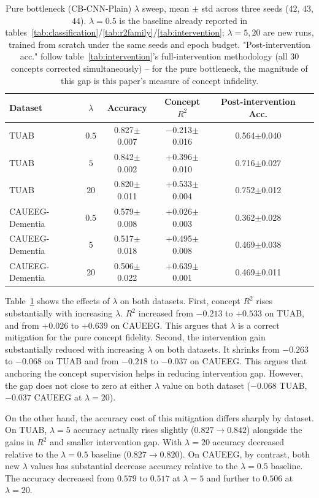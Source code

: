 \documentclass[journal,twoside,web]{ieeecolor}
\begin{document}
\begin{table}[h]
\caption{Pure bottleneck (CB-CNN-Plain) $\lambda$ sweep, mean $\pm$ std across three seeds ($42$, $43$, $44$). $\lambda=0.5$ is the baseline already reported in tables~\ref{tab:classification}/\ref{tab:r2family}/\ref{tab:intervention}; $\lambda=5,20$ are new runs, trained from scratch under the same seeds and epoch budget. "Post-intervention acc." follow table~\ref{tab:intervention}'s full-intervention methodology (all $30$ concepts corrected simultaneously) -- for the pure bottleneck, the magnitude of this gap is this paper's measure of concept infidelity.}

\centering
\begin{tabular}{l c cccc}
\hline
Dataset & $\lambda$ & Accuracy & Concept $R^2$ & Post-intervention Acc. \\
\hline
TUAB & $0.5$ & 0.827$\pm$0.007 & $-$0.213$\pm$0.016 & 0.564$\pm$0.040  \\
TUAB & $5$   & 0.842$\pm$0.002 & +0.396$\pm$0.010 & 0.716$\pm$0.027 \\
TUAB & $20$  & 0.820$\pm$0.011 & +0.533$\pm$0.004 & 0.752$\pm$0.012  \\
\hline
CAUEEG-Dementia & $0.5$ & 0.579$\pm$0.008 & +0.026$\pm$0.003 & 0.362$\pm$0.028  \\
CAUEEG-Dementia & $5$   & 0.517$\pm$0.018 & +0.495$\pm$0.008 & 0.469$\pm$0.038  \\
CAUEEG-Dementia & $20$  & 0.506$\pm$0.022 & +0.639$\pm$0.001 & 0.469$\pm$0.011  \\
\hline
\end{tabular}
\label{tab:lambda_sweep}
\end{table}

Table~\ref{tab:lambda_sweep} shows the effects of $\lambda$ on both datasets. First, concept $R^2$ rises substantially with increasing $\lambda$. $R^2$ increased from $-0.213$ to $+0.533$ on TUAB, and from $+0.026$ to $+0.639$ on CAUEEG. This argues that $\lambda$ is a correct mitigation for the pure concept fidelity. Second, the intervention gain substantially reduced with increasing $\lambda$ on both datasets. It shrinks from $-0.263$ to $-0.068$ on TUAB and from $-0.218$ to $-0.037$ on CAUEEG. This argues that anchoring the concept supervision helps in reducing intervention gap. However, the gap does not close to zero at either $\lambda$ value on both dataset ($-0.068$ TUAB, $-0.037$ CAUEEG at $\lambda=20$). 

On the other hand, the accuracy cost of this mitigation differs sharply by dataset. On TUAB, $\lambda=5$ accuracy actually rises slightly ($0.827 \to 0.842$) alongside the gains in $R^2$ and smaller intervention gap. With $\lambda=20$ accuracy decreased relative to the $\lambda=0.5$ baseline ($0.827 \to 0.820$). On CAUEEG, by contrast, both new $\lambda$ values has substantial decrease accuracy relative to the $\lambda=0.5$ baseline. The accuracy decreased from $0.579$  to $0.517$ at $\lambda=5$ and further to $0.506$ at $\lambda=20$. 
\end{document}
